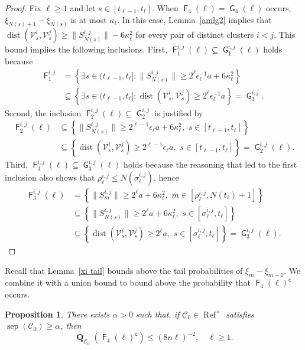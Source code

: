 \documentclass[11pt,reqno]{amsart}
\newtheorem{proposition}[lemma]{Proposition}
\theoremstyle{definition}
\numberwithin{equation}{section}
\newcommand{\1}{\mathbf{1}}
\newcommand{\eps}{\epsilon}
\DeclareMathOperator{\dist}{dist}
\DeclareMathOperator{\PPprod}{\mathbf{Q}}
\DeclareMathOperator{\sep}{sep}
\DeclareMathOperator{\Refcon}{\mathrm{Ref}}
\newcommand{\cc}{\mathsf{c}}
\DeclareMathOperator{\GG}{\mathsf{G}}
\DeclareMathOperator{\FF}{\mathsf{F}}
\newcommand{\CC}{\mathcal{C}}
\newcommand{\VV}{\mathcal{V}}
\begin{document}
\begin{proof}
Fix $\ell \geq 1$ and let $s \in [t_{\ell-1}, t_\ell]$. When $\FF_4 (\ell) = \GG_4 (\ell)$ occurs, $\xi_{N(s)+1} - \xi_{N(s)}$ is at most $\kappa_\ell$. In this case, Lemma~\ref{amlg2} implies that $\dist( \VV_s^i, \VV_s^j ) \geq \|S_{N(s)}^{i,j}\| - 6 \kappa_\ell^2$ for every pair of distinct clusters $i < j$. This bound implies the following inclusions. First, $\FF_1^{i,j} (\ell) \subseteq \GG_1^{i,j} (\ell)$ holds because
\begin{align*}
\FF_1^{i,j} &= \left\{ \exists s \in (t_{\ell-1},t_\ell]: \| S_{N(s)}^{i,j} \| \geq 2^\ell \eps_\ell^{-1} a + 6 \kappa_\ell^2 \right\}\\ 
&\subseteq \left\{ \exists s \in (t_{\ell-1},t_\ell]: \dist(\VV_s^i,\VV_s^j) \geq 2^\ell \eps_\ell^{-1} a \right\} = \GG_1^{i,j}.
\end{align*}
Second, the inclusion $\FF_2^{i,j} (\ell) \subseteq \GG_2^{i,j}$ is justified by
\begin{align*}
\FF_2^{i,j} (\ell) &\subseteq \left\{\|S_{N(s)}^{i,j}\| \geq 2^{\ell-1} \eps_\ell a + 6 \kappa_\ell^2, \,\, s \in [t_{\ell-1},t_\ell]\right\}\\ 
&\subseteq \left\{ \dist (\VV_s^i, \VV_s^j) \geq 2^{\ell-1}\eps_\ell a, \,\, s \in [t_{\ell-1},t_\ell] \right\} = \GG_2^{i,j} (\ell).
\end{align*}
Third, $\FF_3^{i,j} (\ell) \subseteq \GG_3^{i,j} (\ell)$ holds because the reasoning that led to the first inclusion also shows that $\rho_\ell^{i,j} \leq N(\sigma_\ell^{i,j})$, hence
\begin{align*}
\FF_3^{i,j} (\ell) &=\left\{ \|S_{m}^{i,j}\| \geq 2^\ell a + 6 \kappa_\ell^2, \,\, m \in [\rho_\ell^{i,j}, N(t_\ell)+1] \right\}\\ 
&\subseteq \left\{ \|S_{N(s)}^{i,j}\| \geq 2^\ell a + 6 \kappa_\ell^2, \,\, s \in [\sigma_\ell^{i,j}, t_\ell] \right\}\\ 
& \subseteq \left\{ \dist (\VV_s^i, \VV_s^j) \geq 2^\ell a, \,\, s \in [\sigma_\ell^{i,j}, t_\ell] \right\} = \GG_3^{i,j} (\ell).
\end{align*}
\end{proof}



Recall that Lemma~\ref{xi tail} bounds above the tail probabilities of $\xi_m - \xi_{m-1}$. We combine it with a union bound to bound above the probability that $\FF_4 (\ell)^\cc$ occurs.

\begin{proposition}\label{notrunc}
There exists $\alpha > 0$ such that, if $\CC_0 \in \Refcon^\times$ satisfies $\sep (\CC_0) \geq \alpha$, then
\[
\PPprod_{\CC_0} ( \FF_4 (\ell)^\cc ) \leq (8n \ell)^{-2}, \quad \ell \geq 1.
\]
\end{proposition}
\end{document}
